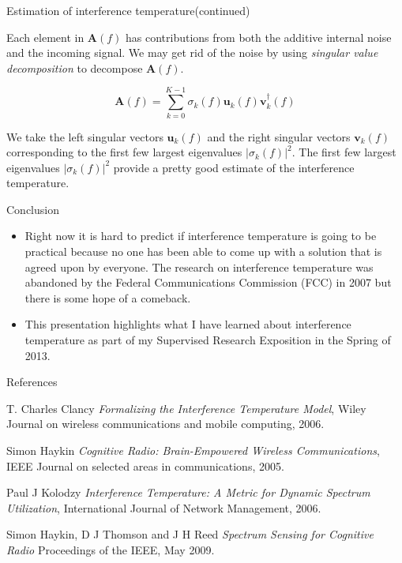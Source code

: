 \documentclass[mathserif]{beamer}
\begin{document}
\begin{frame}{Estimation of interference temperature(continued)}

Each element in $\mathbf{A}(f)$ has contributions from both the additive internal noise and the incoming signal. We may get rid of the noise by using \emph{singular value decomposition} to decompose $\mathbf{A}(f)$.

\begin{equation}
    \mathbf{A}(f) = \sum_{k=0}^{K-1} \sigma_k(f) \mathbf{u}_k(f) \mathbf{v}_k^{\dag}(f)
\end{equation}

We take the left singular vectors $\mathbf{u}_k(f)$ and the right singular vectors $\mathbf{v}_k(f)$ corresponding to the first few largest eigenvalues $|\sigma_k(f)|^2$. The first few largest eigenvalues $|\sigma_k(f)|^2$ provide a pretty good estimate of the interference temperature.

\end{frame}

\begin{frame}{Conclusion}

\begin{itemize}
	\item Right now it is hard to predict if interference temperature is going to be practical because no one has been able to come up with a solution that is agreed upon by everyone. The research on interference temperature was abandoned by the Federal Communications Commission (FCC) in 2007 but there is some hope of a comeback.
	\item This presentation highlights what I have learned about interference temperature as part of my Supervised Research Exposition in the Spring of 2013.

\end{itemize}
\end{frame}




\begin{frame}{References}

\begin{thebibliography}{10}

	T. Charles Clancy
    \newblock \emph{Formalizing the Interference Temperature Model},
    \newblock Wiley Journal on wireless communications and mobile computing, 2006.

    Simon Haykin
    \newblock  \emph{Cognitive Radio: Brain-Empowered Wireless Communications},
    \newblock IEEE Journal on selected areas in communications, 2005.

    Paul J Kolodzy
    \newblock \emph{Interference Temperature: A Metric for Dynamic Spectrum Utilization},
    \newblock International Journal of Network Management, 2006.

    Simon Haykin, D J Thomson and J H Reed
    \newblock \emph{Spectrum Sensing for Cognitive Radio}
    \newblock Proceedings of the IEEE, May 2009.

\end{thebibliography}

\end{frame}
\end{document}
